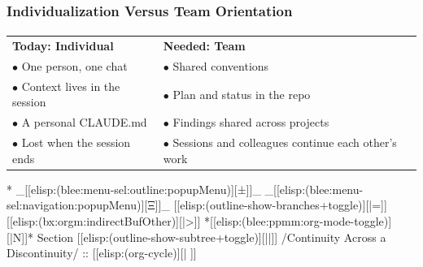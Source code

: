 \begin{whenOrg}
\begin{verblatex}

\begin{frame}[fragile,plain,label=individualVsTeam]
    \frametitle{Individualization Versus Team Orientation}
    \framesubtitle{}

{\renewcommand{\arraystretch}{1.3}
  \begin{tabular}{p{2.6in}p{2.6in}}
    \textbf{Today: Individual} & \textbf{Needed: Team} \\
    $\bullet$ One person, one chat & $\bullet$ Shared conventions \\
    $\bullet$ Context lives in the session & $\bullet$ Plan and status in the repo \\
    $\bullet$ A personal CLAUDE.md & $\bullet$ Findings shared across projects \\
    $\bullet$ Lost when the session ends & $\bullet$ Sessions and colleagues continue each other's work \\
  \end{tabular}
  }


\end{frame}
\end{verblatex}



\begin{whenOrg}
*  _[[elisp:(blee:menu-sel:outline:popupMenu)][±]]_ _[[elisp:(blee:menu-sel:navigation:popupMenu)][Ξ]]_ [[elisp:(outline-show-branches+toggle)][|=]] [[elisp:(bx:orgm:indirectBufOther)][|>]] *[[elisp:(blee:ppmm:org-mode-toggle)][|N]]*  Section    [[elisp:(outline-show-subtree+toggle)][||]]   /Continuity Across a Discontinuity/ ::  [[elisp:(org-cycle)][| ]]
\end{whenOrg}


\end{whenOrg}

